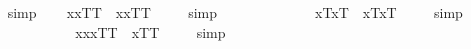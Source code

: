 \begin{isabellebody}
\isadelimproof
\ %
\endisadelimproof
%
\isatagproof
{}\isamarkupfalse%
\ simp\ \isamarkupfalse%
%
\endisatagproof
{\isafoldproof}%
%
\isadelimproof
%
\endisadelimproof
%
\isamarkuptrue%
\ \isamarkupfalse%
\ {\isachardoublequoteopen}{\isacharbrackleft}{\isacharparenleft}\isactrlbold {\isasymforall}x{\isachardot}\isactrlbold {\isasymbox}{\isasymlbrace}x\isactrlsup T{\isacharcomma}{\isasymphi}\isactrlsup T{\isasymrbrace}{\isacharparenright}\ \isactrlbold {\isasymrightarrow}\ \isactrlbold {\isasymbox}{\isacharparenleft}\isactrlbold {\isasymforall}x{\isachardot}{\isasymlbrace}x\isactrlsup T{\isacharcomma}{\isasymphi}\isactrlsup T{\isasymrbrace}{\isacharparenright}{\isacharbrackright}\ {\isacharequal}\ {\isasymtop}{\isachardoublequoteclose}%
\isadelimproof
\ %
\endisadelimproof
%
\isatagproof
{}\isamarkupfalse%
\ simp\ \isamarkupfalse%
%
\endisatagproof
{\isafoldproof}%
%
\isadelimproof
%
\endisadelimproof
\ \ \ \ \ \ \ \ \ \isanewline
\ \isamarkupfalse%
\ {\isachardoublequoteopen}{\isacharbrackleft}{\isacharparenleft}\isactrlbold {\isasymforall}x{\isachardot}\isactrlbold {\isasymbox}{\isasymlparr}{\isasymphi}\isactrlsup T{\isacharcomma}x\isactrlsup T{\isasymrparr}{\isacharparenright}\ \isactrlbold {\isasymrightarrow}\ \isactrlbold {\isasymbox}{\isacharparenleft}\isactrlbold {\isasymforall}x{\isachardot}{\isasymlparr}{\isasymphi}\isactrlsup T{\isacharcomma}x\isactrlsup T{\isasymrparr}{\isacharparenright}{\isacharbrackright}\ {\isacharequal}\ {\isasymtop}{\isachardoublequoteclose}%
\isadelimproof
\ %
\endisadelimproof
%
\isatagproof
{}\isamarkupfalse%
\ simp\ \isamarkupfalse%
%
\endisatagproof
{\isafoldproof}%
%
\isadelimproof
%
\endisadelimproof
\ \ \ \ \ \ \ \ \ \isanewline
\isanewline
\ \isamarkupfalse%
\ {\isachardoublequoteopen}{\isacharbrackleft}{\isacharparenleft}\isactrlbold {\isasymforall}x{\isachardot}\isactrlbold {\isasymbox}{\isacharparenleft}\isactrlbold {\isasymforall}x{\isachardot}{\isasymlbrace}x\isactrlsup T{\isacharcomma}{\isasymphi}\isactrlsup T{\isasymrbrace}{\isacharparenright}\ \isactrlbold {\isasymrightarrow}\ \isactrlbold {\isasymbox}{\isasymlbrace}x\isactrlsup T{\isacharcomma}{\isasymphi}\isactrlsup T{\isasymrbrace}{\isacharparenright}{\isacharbrackright}\ {\isacharequal}\ {\isasymtop}{\isachardoublequoteclose}%
\isadelimproof
\ %
\endisadelimproof
%
\isatagproof
{}\isamarkupfalse%
\ simp\ \isamarkupfalse%

\end{isabellebody}
